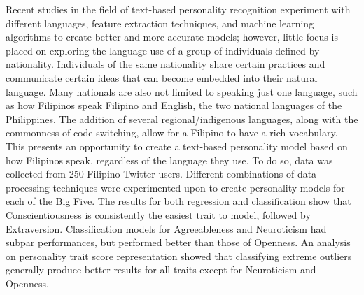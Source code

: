 Recent studies in the field of text-based personality recognition experiment with different languages, feature extraction techniques, and machine learning algorithms to create better and more accurate models; however, little focus is placed on exploring the language use of a group of individuals defined by nationality. Individuals of the same nationality share certain practices and communicate certain ideas that can become embedded into their natural language. Many nationals are also not limited to speaking just one language, such as how Filipinos speak Filipino and English, the two national languages of the Philippines. The addition of several regional/indigenous languages, along with the commonness of code-switching, allow for a Filipino to have a rich vocabulary. This presents an opportunity to create a text-based personality model based on how Filipinos speak, regardless of the language they use. To do so, data was collected from 250 Filipino Twitter users. Different combinations of data processing techniques were experimented upon to create personality models for each of the Big Five. The results for both regression and classification show that Conscientiousness is consistently the easiest trait to model, followed by Extraversion. Classification models for Agreeableness and Neuroticism had subpar performances, but performed better than those of Openness. An analysis on personality trait score representation showed that classifying extreme outliers generally produce better results for all traits except for Neuroticism and Openness.
